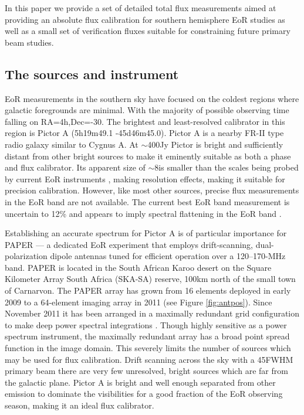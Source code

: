 \documentclass[preprint]{aastex}
\begin{document}
In this paper we provide a set of detailed total flux measurements aimed at providing
an absolute flux calibration for southern hemisphere EoR studies as well as a
small set of verification fluxes suitable for constraining future primary beam studies.

\subsection{The sources and instrument}
EoR measurements in the southern sky have focused on the coldest regions where
galactic foregrounds are minimal. With the majority of possible observing time falling on 
RA=4h,Dec=-30. The brightest and least-resolved calibrator in this region is Pictor A 
(5h19m49.1 -45d46m45.0). Pictor A is a nearby FR-II type radio galaxy 
 similar to Cygnus A.  At $\sim$400Jy Pictor is bright and sufficiently distant from other 
bright sources to make it eminently suitable as both a phase and flux calibrator. Its apparent
size of $\sim$8\arcmin is smaller than the scales being probed by current EoR instruments , 
making resolution effects, making it suitable for precision calibration.  However, 
like most other sources, precise flux measurements in the EoR band are not available.
The current best EoR band measurement
is uncertain to 12\% and appears to imply spectral flattening in the EoR band
\citep{Perley:1997p9312}. 
 
Establishing an accurate spectrum for Pictor A is of particular importance for
PAPER --- a dedicated EoR experiment 
that employs drift-scanning, dual-polarization dipole antennas 
tuned for efficient operation over a 120--170-MHz band.  PAPER is located in the South African Karoo desert
on the Square Kilometer Array
South Africa (SKA-SA) reserve, 100km north of the small town of Carnarvon.
The PAPER array has grown from 16 elements deployed in early 2009 to a
64-element imaging array in 2011 (see Figure \ref{fig:antpos}). 
Since November 2011 it has been arranged in a maximally redundant grid 
configuration to make deep power spectral integrations \citep{Parsons:2012a}.
Though highly sensitive as a power spectrum instrument, the maximally redundant array 
has a broad point spread function in the image domain. This severely limits the number 
of sources which may be used for flux calibration. Drift scanning across the sky with a 45\arcdeg FWHM
primary beam there are very few unresolved, bright sources which are far from the galactic plane. 
Pictor A is bright and well enough separated from other emission to dominate the visibilities for a good fraction of
the EoR observing season, making it an ideal flux calibrator.
\end{document}

